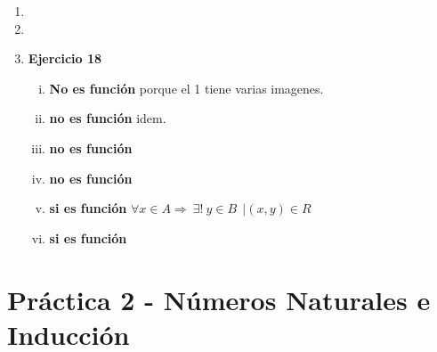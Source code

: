 \documentclass[12pt]{book}
\begin{document}
\begin{enumerate}
	\item %
	\item %
	
	\item %
\textbf{Ejercicio 18}
\begin{enumerate}[i)]
	\item \textbf{No es funci\'on} porque el 1 tiene varias imagenes.
	\item \textbf{no es funci\'on} idem.
	\item \textbf{no es funci\'on}
	\item \textbf{no es funci\'on}
	\item \textbf{si es funci\'on} $ \forall x \in A \Rightarrow \ \exists ! 	\ y \in B \ \ \vert (x,y) \in R$
	\item \textbf{si es funci\'on}
\end{enumerate}	
		
\end{enumerate}
	
\chapter{Práctica 2 - Números Naturales e Inducción} 
%
\end{document}

